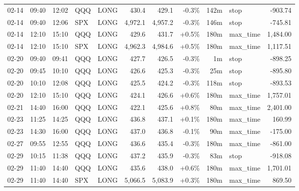 \documentclass[11pt,a4paper,twoside]{article}
\begin{document}
\begin{center}
\begin{longtable}{>{\color{txtmain}}l l l l l r r r r >{\color{txtmain}}l r}
02-14 & 09:40 & 12:02 & QQQ & LONG & 430.4 & 429.1 & \textcolor{lossred}{-0.3\%} & 142m & stop & \textcolor{lossred}{-903.74} \\
02-14 & 09:40 & 12:06 & SPX & LONG & 4,972.1 & 4,957.2 & \textcolor{lossred}{-0.3\%} & 146m & stop & \textcolor{lossred}{-745.81} \\
02-14 & 12:10 & 15:10 & QQQ & LONG & 429.6 & 431.7 & \textcolor{wingreen}{+0.5\%} & 180m & max\_time & \textcolor{wingreen}{1,484.00} \\
02-14 & 12:10 & 15:10 & SPX & LONG & 4,962.3 & 4,984.6 & \textcolor{wingreen}{+0.5\%} & 180m & max\_time & \textcolor{wingreen}{1,117.51} \\
02-20 & 09:40 & 09:41 & QQQ & LONG & 427.7 & 426.5 & \textcolor{lossred}{-0.3\%} & 1m & stop & \textcolor{lossred}{-898.25} \\
02-20 & 09:45 & 10:10 & QQQ & LONG & 426.6 & 425.3 & \textcolor{lossred}{-0.3\%} & 25m & stop & \textcolor{lossred}{-895.80} \\
02-20 & 10:10 & 12:08 & QQQ & LONG & 425.5 & 424.2 & \textcolor{lossred}{-0.3\%} & 118m & stop & \textcolor{lossred}{-893.53} \\
02-20 & 12:10 & 15:10 & QQQ & LONG & 424.1 & 426.6 & \textcolor{wingreen}{+0.6\%} & 180m & max\_time & \textcolor{wingreen}{1,757.01} \\
02-21 & 14:40 & 16:00 & QQQ & LONG & 422.1 & 425.6 & \textcolor{wingreen}{+0.8\%} & 80m & max\_time & \textcolor{wingreen}{2,401.00} \\
02-23 & 11:25 & 14:25 & QQQ & LONG & 436.8 & 437.1 & \textcolor{wingreen}{+0.1\%} & 180m & max\_time & \textcolor{wingreen}{160.99} \\
02-23 & 14:30 & 16:00 & QQQ & LONG & 437.0 & 436.8 & \textcolor{lossred}{-0.1\%} & 90m & max\_time & \textcolor{lossred}{-175.00} \\
02-27 & 09:55 & 12:55 & QQQ & LONG & 436.6 & 435.4 & \textcolor{lossred}{-0.3\%} & 180m & max\_time & \textcolor{lossred}{-861.00} \\
02-29 & 10:15 & 11:38 & QQQ & LONG & 437.2 & 435.9 & \textcolor{lossred}{-0.3\%} & 83m & stop & \textcolor{lossred}{-918.08} \\
02-29 & 11:40 & 14:40 & QQQ & LONG & 435.6 & 438.0 & \textcolor{wingreen}{+0.6\%} & 180m & max\_time & \textcolor{wingreen}{1,701.01} \\
02-29 & 11:40 & 14:40 & SPX & LONG & 5,066.5 & 5,083.9 & \textcolor{wingreen}{+0.3\%} & 180m & max\_time & \textcolor{wingreen}{869.50} \\

\end{longtable}
\end{center}
\end{document}
